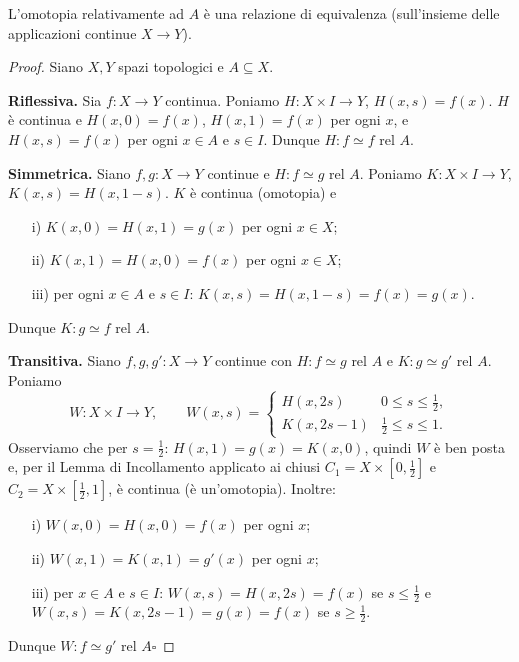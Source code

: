 \begin{teo}
L'omotopia relativamente ad $A$ \`e una relazione di equivalenza (sull'insieme delle applicazioni continue $X \to Y$).
\end{teo}

\begin{proof}
Siano $X, Y$ spazi topologici e $A \subseteq X$.

\textbf{Riflessiva.} Sia $f: X \to Y$ continua. Poniamo $H: X \times I \to Y$, $H(x,s) = f(x)$. $H$ \`e continua e $H(x,0) = f(x)$, $H(x,1) = f(x)$ per ogni $x$, e $H(x,s) = f(x)$ per ogni $x \in A$ e $s \in I$. Dunque $H: f \simeq f$ rel $A$.

\textbf{Simmetrica.} Siano $f, g: X \to Y$ continue e $H: f \simeq g$ rel $A$. Poniamo $K: X \times I \to Y$, $K(x,s) = H(x, 1-s)$. $K$ \`e continua (omotopia) e
\begin{enumerate}
    \item[i)] $K(x,0) = H(x,1) = g(x)$ per ogni $x \in X$;
    \item[ii)] $K(x,1) = H(x,0) = f(x)$ per ogni $x \in X$;
    \item[iii)] per ogni $x \in A$ e $s \in I$: $K(x,s) = H(x,1-s) = f(x) = g(x)$.
\end{enumerate}
Dunque $K: g \simeq f$ rel $A$.

\textbf{Transitiva.} Siano $f, g, g': X \to Y$ continue con $H: f \simeq g$ rel $A$ e $K: g \simeq g'$ rel $A$. Poniamo
\[
W: X \times I \to Y, \qquad W(x,s) = \begin{cases} H(x, 2s) & 0 \leqslant s \leqslant \tfrac12, \\[1mm] K(x, 2s-1) & \tfrac12 \leqslant s \leqslant 1. \end{cases}
\]
Osserviamo che per $s = \frac12$: $H(x, 1) = g(x) = K(x, 0)$, quindi $W$ \`e ben posta e, per il Lemma di Incollamento applicato ai chiusi $C_1 = X \times [0, \frac12]$ e $C_2 = X \times [\frac12, 1]$, \`e continua (\`e un'omotopia). Inoltre:
\begin{enumerate}
    \item[i)] $W(x,0) = H(x,0) = f(x)$ per ogni $x$;
    \item[ii)] $W(x,1) = K(x,1) = g'(x)$ per ogni $x$;
    \item[iii)] per $x \in A$ e $s \in I$: $W(x,s) = H(x,2s) = f(x)$ se $s \leqslant \frac12$ e $W(x,s) = K(x,2s-1) = g(x) = f(x)$ se $s \geqslant \frac12$.
\end{enumerate}
Dunque $W: f \simeq g'$ rel $A$\hfill$\square$
\end{proof}

